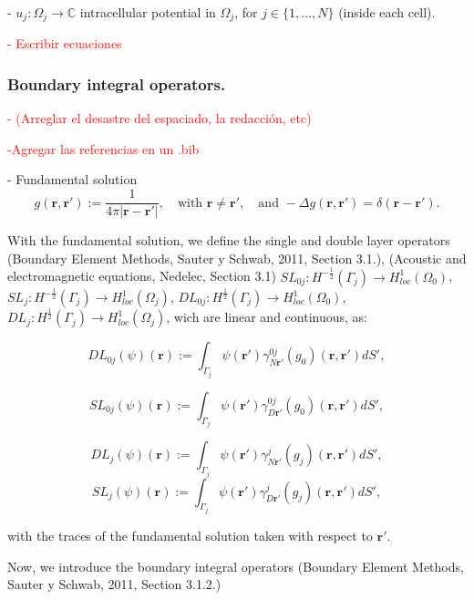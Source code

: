 \documentclass[]{article}%
\begin{document}
- $u_j: \Omega_j \rightarrow \mathbb{C}$ intracellular potential in $\Omega_j$, for $j\in \{1,...,N\}$ (inside each cell).

\textcolor{red}{- Escribir ecuaciones}

\subsubsection{Boundary integral operators.}
\textcolor{red}{- (Arreglar el desastre del espaciado, la redacci\'on, etc)}

\textcolor{red}{-Agregar las referencias en un .bib}

- Fundamental solution $$g\left(\mathbf{r},\mathbf{r'}\right):= \frac{1}{4\pi |\mathbf{r}-\mathbf{r'}|}, \quad \mbox{with } \mathbf{r}\not = \mathbf{r'}, \quad \mbox{and } -\Delta g\left(\mathbf{r},\mathbf{r'}\right)=\delta \left(\mathbf{r}-\mathbf{r'}\right).$$

With the fundamental solution, we define the single and double layer operators (Boundary Element Methods, Sauter y Schwab, 2011, Section 3.1.), (Acoustic and electromagnetic equations, Nedelec, Section 3.1)
$SL_{0j}: H^{-\frac{1}{2}}(\Gamma_j) \rightarrow H^1_{loc}(\Omega_0)$,
$SL_{j}: H^{-\frac{1}{2}}(\Gamma_j) \rightarrow H^1_{loc}(\Omega_j)$,
$DL_{0j}: H^{\frac{1}{2}}(\Gamma_j) \rightarrow H^1_{loc}(\Omega_0)$,
$DL_{j}: H^{\frac{1}{2}}(\Gamma_j)\rightarrow H^1_{loc}(\Omega_j)$, wich are linear and continuous, as:

$$DL_{0j} \left(\psi\right)\left(\mathbf{r}\right):=	\int_{\Gamma_j}  \psi\left(\mathbf{r}'\right) \gamma_{N{\mathbf{r}'}}^{0j} \left(g_0\right)\left(\mathbf{r},\mathbf{r'}\right) dS',$$
 
 $$SL_{0j} \left(\psi\right)\left(\mathbf{r}\right):=	\int_{\Gamma_j}  {\psi\left(\mathbf{r}'\right) \gamma_{D\mathbf{r}'}^{0j}\left(g_0\right)\left(\mathbf{r},\mathbf{r'}\right) dS'},$$
 
 $$DL_j \left(\psi\right)\left(\mathbf{r}\right):=	\int_{\Gamma_j}  {\psi\left(\mathbf{r}'\right) \gamma_{N{\mathbf{r}'}}^{j} \left(g_j\right)\left(\mathbf{r},\mathbf{r'}\right) dS'},$$ 
 $$SL_j \left(\psi\right)\left(\mathbf{r}\right):=	\int_{\Gamma_j}  {\psi\left(\mathbf{r}' \right) \gamma_{D\mathbf{r}'}^{j}\left(g_j\right)\left(\mathbf{r},\mathbf{r'}\right) dS'},$$
 
with the traces of the fundamental solution taken with respect to $\mathbf{r}'$.

Now, we introduce the boundary integral operators (Boundary Element Methods, Sauter y Schwab, 2011, Section 3.1.2.)
\end{document}
